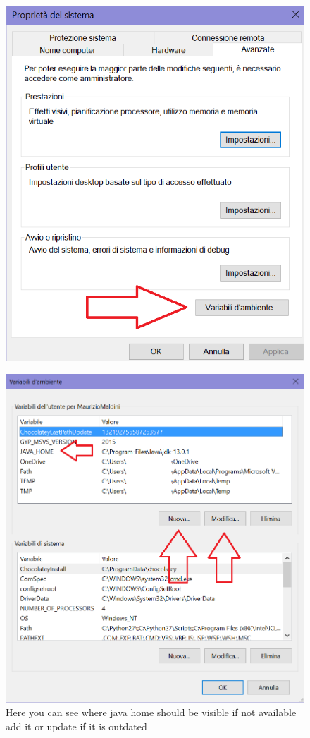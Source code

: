 \begin{figure}[h]
\centering
\includegraphics{Images/env.png}
\end{figure} 
\begin{figure}[h]
\centering
\includegraphics{Images/environment.png}
\caption{\label{fig:myi} Here you can see where java home should be visible if not available add it or update if it is outdated}
\end{figure} 

